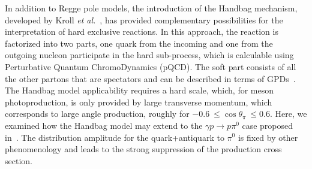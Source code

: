 \documentclass[aps,prc,twocolumn,floatfix,showpacs,preprintnumbers,amsmath,amssymb,superscriptaddress,linenumbers]{revtex4-1}
\begin{document}
In addition to Regge pole models, the introduction of the Handbag mechanism, developed by 
Kroll \textit{et al.}~\cite{Huang:2000kd}, has provided complementary 
possibilities for the interpretation of hard exclusive reactions. In 
this approach, the reaction is factorized into two parts, one quark 
from the incoming and one from the outgoing nucleon participate in the 
hard sub-process, which is calculable using Perturbative Quantum ChromoDynamics (pQCD). The soft part 
consists of all the other partons that are spectators and can be 
described in terms of GPDs~\cite{Ji:1996nm}.
The Handbag model applicability requires a hard scale, which, for meson 
photoproduction, is only provided by large transverse momentum, which 
corresponds to large angle production, roughly for 
$-0.6~\leq\cos \theta_{\pi}~\leq 0.6$.  Here, we examined how the Handbag 
model may extend to the $\gamma p\rightarrow p\pi^0$ case proposed in~\cite{Huang:2000kd}. The distribution amplitude for the 
quark+antiquark to $\pi^0$ is fixed by other phenomenology and 
leads to the strong suppression of the production cross section.	


\end{document}
